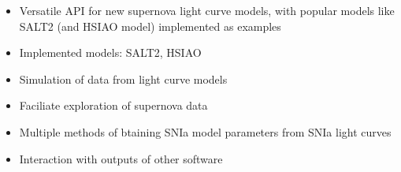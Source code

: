 
\begin{itemize}
\item Versatile API for new supernova light curve models, with popular models like SALT2 (and HSIAO model) implemented as examples 
\item Implemented models: SALT2, HSIAO
\item Simulation of data from light curve models
\item Faciliate exploration of supernova data
\item Multiple methods of btaining SNIa model parameters from SNIa light curves
\item Interaction with outputs of other software
\end{itemize}
